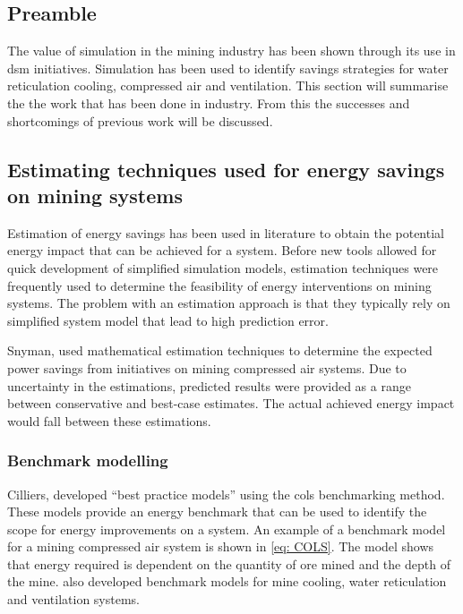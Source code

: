 	\subsection{Preamble}
	The value of simulation in  the mining industry has been shown through its use in \gls{dsm} initiatives. Simulation has been used to identify savings strategies for water reticulation cooling, compressed air and ventilation. This section will summarise the the work that has been done in industry. From this the successes and shortcomings of previous work will be discussed.
	
		\subsection{Estimating techniques used for energy savings on mining systems }
		Estimation of energy savings has been used in literature to obtain the potential energy impact that can be achieved for a system. Before new tools allowed for quick development of simplified simulation models, estimation techniques were frequently used to determine the feasibility of energy interventions on mining systems. The problem with an estimation approach is that they typically rely on simplified system model that lead to high prediction error.
		\par 
		Snyman, \cite{Snyman2011Masters} used mathematical estimation techniques to determine the expected power savings from initiatives on mining compressed air systems.  Due to uncertainty in the estimations, \cite{Snyman2011Masters} predicted results were provided as a range between conservative and best-case estimates. The actual achieved energy impact would fall between these estimations.
		 	
		\subsubsection{Benchmark modelling}
		 Cilliers, \cite{Cilliers2015PHD} developed \enquote{best practice models} using the \gls{cols} benchmarking method. These models provide an energy benchmark that can be used to identify the scope for energy improvements on a system. An example of a benchmark model for a mining compressed air system is shown in \cref{eq: COLS}. The model shows that energy required is dependent on the quantity of ore mined and the depth of the mine. \cite{Cilliers2015PHD} also developed benchmark models for mine cooling, water reticulation and ventilation systems.

		\begin{figure}[h!]
			\centering
			\fbox{\hspace{2cm}\hspace{2cm}}
			\caption{ }
			\label{fig: 3D Benchmark}
		\end{figure}
